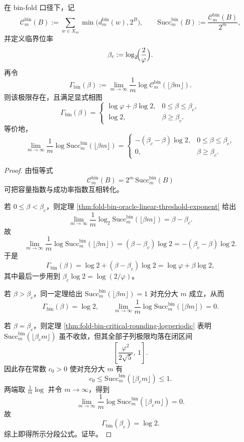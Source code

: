 \begin{theorem}\label{thm:derived-binfold-oracle-capacity-phase-diagram}
在 bin-fold 口径下，记
\[
\mathcal C_m^{\mathrm{bin}}(B):=\sum_{w\in X_m}\min\bigl(d_m^{\mathrm{bin}}(w),2^B\bigr),
\qquad
\mathrm{Succ}^{\mathrm{bin}}_m(B):=\frac{\mathcal C_m^{\mathrm{bin}}(B)}{2^m},
\]
并定义临界位率
\[
\beta_c:=\log_2\!\Bigl(\frac{2}{\varphi}\Bigr).
\]
再令
\[
\Gamma_{\mathrm{bin}}(\beta):=
\lim_{m\to\infty}\frac1m\log \mathcal C_m^{\mathrm{bin}}(\lfloor \beta m\rfloor).
\]
则该极限存在，且满足显式相图
\[
\boxed{
\Gamma_{\mathrm{bin}}(\beta)=
\begin{cases}
\log\varphi+\beta\log 2, & 0\le \beta\le \beta_c,\\[2mm]
\log 2, & \beta\ge \beta_c.
\end{cases}}
\]
等价地，
\[
\boxed{
\lim_{m\to\infty}\frac1m\log \mathrm{Succ}^{\mathrm{bin}}_m(\lfloor \beta m\rfloor)
=
\begin{cases}
-(\beta_c-\beta)\log 2, & 0\le \beta\le \beta_c,\\[2mm]
0, & \beta\ge \beta_c.
\end{cases}}
\]
\end{theorem}
\begin{proof}
由恒等式
\[
\mathcal C_m^{\mathrm{bin}}(B)=2^m\,\mathrm{Succ}^{\mathrm{bin}}_m(B)
\]
可把容量指数与成功率指数互相转化。

若 \(0\le \beta<\beta_c\)，则定理 \ref{thm:fold-bin-oracle-linear-threshold-exponent} 给出
\[
\lim_{m\to\infty}\frac1m\log_2 \mathrm{Succ}^{\mathrm{bin}}_m(\lfloor \beta m\rfloor)
=
\beta-\beta_c.
\]
故
\[
\lim_{m\to\infty}\frac1m\log \mathrm{Succ}^{\mathrm{bin}}_m(\lfloor \beta m\rfloor)
=
(\beta-\beta_c)\log 2
=
-(\beta_c-\beta)\log 2.
\]
于是
\[
\Gamma_{\mathrm{bin}}(\beta)
=
\log 2+(\beta-\beta_c)\log 2
=
\log\varphi+\beta\log 2,
\]
其中最后一步用到 \(\beta_c\log 2=\log(2/\varphi)\)。

若 \(\beta>\beta_c\)，同一定理给出
\(
\mathrm{Succ}^{\mathrm{bin}}_m(\lfloor \beta m\rfloor)=1
\)
对充分大 \(m\) 成立，从而
\[
\Gamma_{\mathrm{bin}}(\beta)=\log 2,
\qquad
\lim_{m\to\infty}\frac1m\log \mathrm{Succ}^{\mathrm{bin}}_m(\lfloor \beta m\rfloor)=0.
\]

若 \(\beta=\beta_c\)，则定理 \ref{thm:fold-bin-critical-rounding-logperiodic} 表明
\(
\mathrm{Succ}^{\mathrm{bin}}_m(\lfloor \beta_c m\rfloor)
\)
虽不收敛，但其全部子列极限均落在闭区间
\[
\left[\frac{\varphi^2}{2\sqrt5},\,1\right].
\]
因此存在常数 \(c_0>0\) 使对充分大 \(m\) 有
\[
c_0\le \mathrm{Succ}^{\mathrm{bin}}_m(\lfloor \beta_c m\rfloor)\le 1.
\]
两端取 \(\frac1m\log\) 并令 \(m\to\infty\)，得到
\[
\lim_{m\to\infty}\frac1m\log \mathrm{Succ}^{\mathrm{bin}}_m(\lfloor \beta_c m\rfloor)=0.
\]
故
\[
\Gamma_{\mathrm{bin}}(\beta_c)=\log 2.
\]
综上即得所示分段公式。证毕。
\end{proof}

